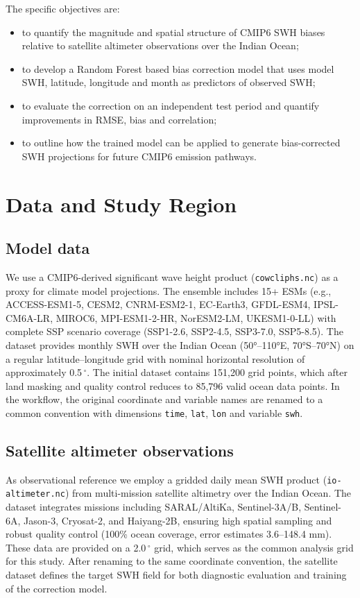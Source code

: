 \documentclass[twocolumn]{article}
\newcommand{\SI}[2]{#1\,#2}
\newcommand{\degree}{\ensuremath{^\circ}}
\begin{document}
The specific objectives are:
\begin{itemize}
  \item to quantify the magnitude and spatial structure of CMIP6 SWH biases relative to satellite altimeter observations over the Indian Ocean;
  \item to develop a Random Forest based bias correction model that uses model SWH, latitude, longitude and month as predictors of observed SWH;
  \item to evaluate the correction on an independent test period and quantify improvements in RMSE, bias and correlation;
  \item to outline how the trained model can be applied to generate bias-corrected SWH projections for future CMIP6 emission pathways.
\end{itemize}

\section{Data and Study Region}
 
 \subsection{Model data}
 
 We use a CMIP6-derived significant wave height product (\texttt{cowcliphs.nc}) as a proxy for climate model projections. The ensemble includes 15+ ESMs (e.g., ACCESS-ESM1-5, CESM2, CNRM-ESM2-1, EC-Earth3, GFDL-ESM4, IPSL-CM6A-LR, MIROC6, MPI-ESM1-2-HR, NorESM2-LM, UKESM1-0-LL) with complete SSP scenario coverage (SSP1-2.6, SSP2-4.5, SSP3-7.0, SSP5-8.5). The dataset provides monthly SWH over the Indian Ocean (50°--110°E, 70°S--70°N) on a regular latitude--longitude grid with nominal horizontal resolution of approximately \SI{0.5}{\degree}. The initial dataset contains 151,200 grid points, which after land masking and quality control reduces to 85,796 valid ocean data points. In the workflow, the original coordinate and variable names are renamed to a common convention with dimensions \texttt{time}, \texttt{lat}, \texttt{lon} and variable \texttt{swh}.
 
 \subsection{Satellite altimeter observations}
 
 As observational reference we employ a gridded daily mean SWH product (\texttt{io-altimeter.nc}) from multi-mission satellite altimetry over the Indian Ocean. The dataset integrates missions including SARAL/AltiKa, Sentinel-3A/B, Sentinel-6A, Jason-3, Cryosat-2, and Haiyang-2B, ensuring high spatial sampling and robust quality control (100\% ocean coverage, error estimates 3.6--148.4 mm). These data are provided on a \SI{2.0}{\degree} grid, which serves as the common analysis grid for this study. After renaming to the same coordinate convention, the satellite dataset defines the target SWH field for both diagnostic evaluation and training of the correction model.
 
\end{document}
